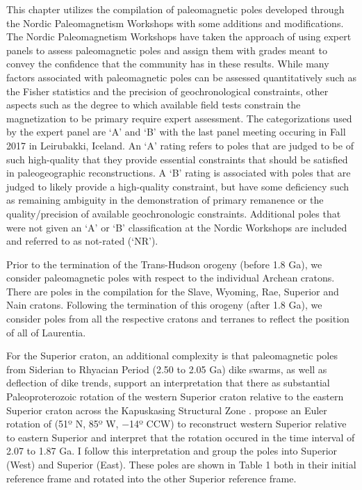 \documentclass[11pt,letterpaper]{article}
\begin{document}
This chapter utilizes the compilation of paleomagnetic poles developed through the Nordic Paleomagnetism Workshops with some additions and modifications. The Nordic Paleomagnetism Workshops have taken the approach of using expert panels to assess paleomagnetic poles and assign them with grades meant to convey the confidence that the community has in these results. While many factors associated with paleomagnetic poles can be assessed quantitatively such as the Fisher statistics and the precision of geochronological constraints, other aspects such as the degree to which available field tests constrain the magnetization to be primary require expert assessment. The categorizations used by the expert panel are `A' and `B' with the last panel meeting occuring in Fall 2017 in Leirubakki, Iceland. An `A' rating refers to poles that are judged to be of such high-quality that they provide essential constraints that should be satisfied in paleogeographic reconstructions. A `B' rating is associated with poles that are judged to likely provide a high-quality constraint, but have some deficiency such as remaining ambiguity in the demonstration of primary remanence or the quality/precision of available geochronologic constraints. Additional poles that were not given an `A' or `B' classification at the Nordic Workshops are included and referred to as not-rated (`NR').

Prior to the termination of the Trans-Hudson orogeny (before 1.8 Ga), we consider paleomagnetic poles with respect to the individual Archean cratons. There are poles in the compilation for the Slave, Wyoming, Rae, Superior and Nain cratons. Following the termination of this orogeny (after 1.8 Ga), we consider poles from all the respective cratons and terranes to reflect the position of all of Laurentia.

For the Superior craton, an additional complexity is that paleomagnetic poles from Siderian to Rhyacian Period (2.50 to 2.05 Ga) dike swarms, as well as deflection of dike trends, support an interpretation that there as substantial Paleoproterozoic rotation of the western Superior craton relative to the eastern Superior craton across the Kapuskasing Structural Zone \citep{Bates1991a, Evans2010a}. \cite{Evans2010a} propose an Euler rotation of (51º N, 85º W, −14º CCW) to reconstruct western Superior relative to eastern Superior and interpret that the rotation occured in the time interval of 2.07 to 1.87 Ga. I follow this interpretation and group the poles into Superior (West) and Superior (East). These poles are shown in Table 1 both in their initial reference frame and rotated into the other Superior reference frame.
\end{document}
